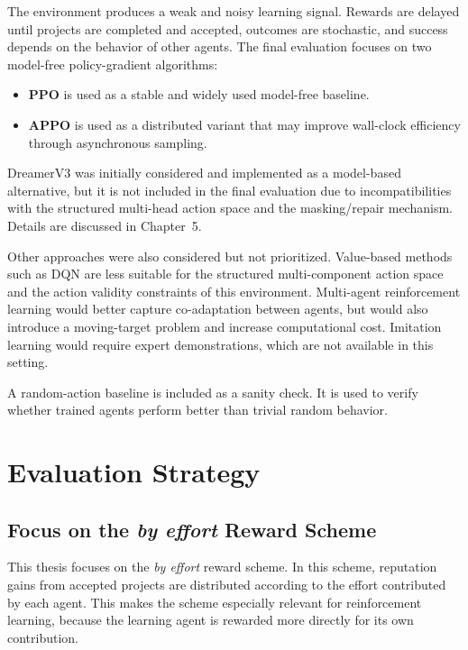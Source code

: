 \documentclass[english,bachelor]{hsluthesis}
\begin{document}
The environment produces a weak and noisy learning signal. Rewards are delayed until projects are completed and accepted, outcomes are stochastic, and success depends on the behavior of other agents. The final evaluation focuses on two model-free policy-gradient algorithms:

\begin{itemize}
    \item \textbf{PPO} is used as a stable and widely used model-free baseline.
    \item \textbf{APPO} is used as a distributed variant that may improve wall-clock efficiency through asynchronous sampling.
\end{itemize}

DreamerV3 was initially considered and implemented as a model-based alternative, but it is not included in the final evaluation due to incompatibilities with the structured multi-head action space and the masking/repair mechanism. Details are discussed in Chapter~5.

Other approaches were also considered but not prioritized. Value-based methods such as DQN are less suitable for the structured multi-component action space and the action validity constraints of this environment. Multi-agent reinforcement learning would better capture co-adaptation between agents, but would also introduce a moving-target problem and increase computational cost. Imitation learning would require expert demonstrations, which are not available in this setting.

A random-action baseline is included as a sanity check. It is used to verify whether trained agents perform better than trivial random behavior.

\section{Evaluation Strategy}

\subsection{Focus on the \textit{by effort} Reward Scheme}

This thesis focuses on the \textit{by effort} reward scheme. In this scheme, reputation gains from accepted projects are distributed according to the effort contributed by each agent. This makes the scheme especially relevant for reinforcement learning, because the learning agent is rewarded more directly for its own contribution.
\end{document}
